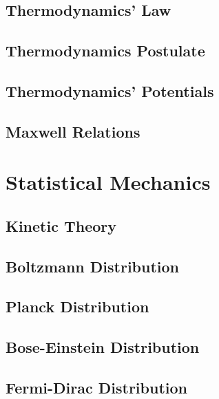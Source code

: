 \documentclass[10pt]{report}
\begin{document}
\section*{Thermodynamics' Law}
\clearpage

\section*{Thermodynamics Postulate}
\clearpage

\section*{Thermodynamics' Potentials}
\clearpage

\section*{Maxwell Relations}
\clearpage

\chapter*{Statistical Mechanics}
\section*{Kinetic Theory}
\clearpage

\section*{Boltzmann Distribution}
\clearpage

\section*{Planck Distribution}
\clearpage

\section*{Bose-Einstein Distribution}
\clearpage

\section*{Fermi-Dirac Distribution}
\clearpage
\printbibliography
\end{document}
